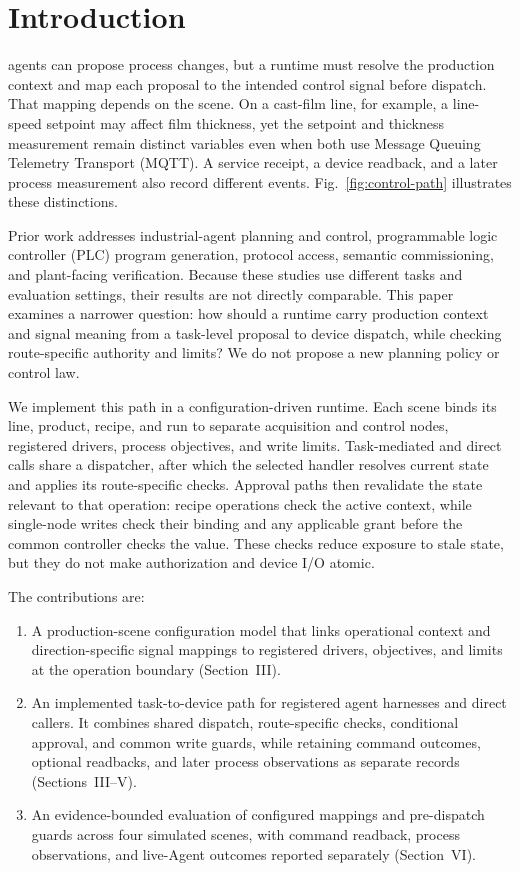 \section{Introduction}
 agents can propose process changes, but a runtime must resolve the production context and map each proposal to the intended control signal before dispatch. That mapping depends on the scene. On a cast-film line, for example, a line-speed setpoint may affect film thickness, yet the setpoint and thickness measurement remain distinct variables even when both use Message Queuing Telemetry Transport (MQTT). A service receipt, a device readback, and a later process measurement also record different events. Fig.~\ref{fig:control-path} illustrates these distinctions.

Prior work addresses industrial-agent planning and control, programmable logic controller (PLC) program generation, protocol access, semantic commissioning, and plant-facing verification. Because these studies use different tasks and evaluation settings, their results are not directly comparable. This paper examines a narrower question: how should a runtime carry production context and signal meaning from a task-level proposal to device dispatch, while checking route-specific authority and limits? We do not propose a new planning policy or control law.

We implement this path in a configuration-driven runtime. Each scene binds its line, product, recipe, and run to separate acquisition and control nodes, registered drivers, process objectives, and write limits. Task-mediated and direct calls share a dispatcher, after which the selected handler resolves current state and applies its route-specific checks. Approval paths then revalidate the state relevant to that operation: recipe operations check the active context, while single-node writes check their binding and any applicable grant before the common controller checks the value. These checks reduce exposure to stale state, but they do not make authorization and device I/O atomic.

The contributions are:
\begin{enumerate}
  \item A production-scene configuration model that links operational context and direction-specific signal mappings to registered drivers, objectives, and limits at the operation boundary (Section~III).
  \item An implemented task-to-device path for registered agent harnesses and direct callers. It combines shared dispatch, route-specific checks, conditional approval, and common write guards, while retaining command outcomes, optional readbacks, and later process observations as separate records (Sections~III--V).
  \item An evidence-bounded evaluation of configured mappings and pre-dispatch guards across four simulated scenes, with command readback, process observations, and live-Agent outcomes reported separately (Section~VI).
\end{enumerate}

